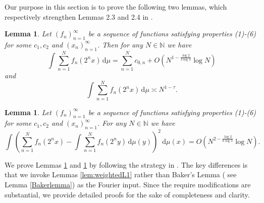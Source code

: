 \documentclass[amssymb,amsfonts,refcheck,12pt,verbatim,righttag]{amsart}
\numberwithin{equation}{section} %
\newtheorem{lem}[thm]{Lemma}
\theoremstyle{plain}
\begin{document}
Our purpose in this section  is to  prove the following two lemmas, which respectively strengthen Lemmas 2.3 and 2.4 in \cite{Baker25A}. 


\begin{lem}
	\label{Lemma1}
	Let $(f_n)_{n=1}^{\infty}$ be a sequence of functions satisfying properties (1)-(6) for some $c_{1},c_{2}$ and $(x_{n})_{n=1}^{\infty}$. Then for any $N\in\mathbb{N}$ we have 
\begin{equation}\label{eqsumfn1N}
\int \sum_{n=1}^{N}f_{n}(2^nx)\, \mathrm{d}\mu = \sum_{n=1}^{N}c_{0,n}+O\left(N^{1-\frac{\log2}{3\log3}}\log N\right)
\end{equation}
 and $$\int \sum_{n=1}^{N}f_{n}(2^nx)\, \mathrm{d}\mu \asymp N^{1-\tau}.$$
\end{lem}

\begin{lem}
	\label{Lemma2}
	Let $(f_n)_{n=1}^{\infty}$ be a sequence of functions satisfying properties (1)-(6) for some $c_{1},c_{2}$ and $(x_{n})_{n=1}^{\infty}$. For any $N\in\mathbb{N}$ we have 
	$$\int \left(\sum_{n=1}^{N}f_{n}(2^nx)-\int \sum_{n=1}^{N}f_{n}(2^ny)\, \mathrm{d}\mu(y) \right)^2\,  \mathrm{d}\mu(x)=O\left(N^{2-\frac{\log2}{6\log3}}\log N\right).$$
\end{lem}
We prove Lemmas \ref{Lemma1} and \ref{Lemma2} by following the strategy in \cite{Baker25A}. The key differences is that we invoke Lemmas \ref{lem:weightedL1} rather than Baker's Lemma ( see Lemma \ref{Bakerlemma}) as the Fourier input. Since the require modifications are substantial, we provide detailed proofs for the sake of completeness and clarity.
\end{document}
